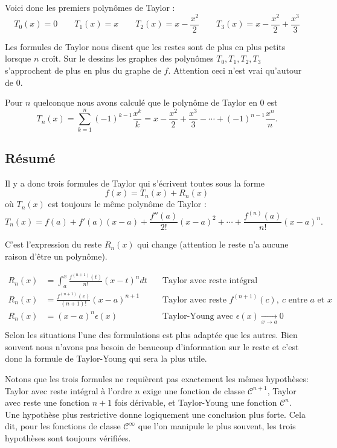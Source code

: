 \documentclass[class=report,crop=false]{standalone}
\begin{document}
Voici donc les premiers polynômes de Taylor :
$$T_0(x)=0 \qquad T_1(x) = x \qquad T_2(x) = x -\frac{x^2}{2}
\qquad T_3(x) = x -\frac{x^2}{2} + \frac{x^3}{3}$$

Les formules de Taylor nous disent que les restes sont de plus en plus petits lorsque $n$ croît.
Sur le dessins les graphes des polynômes $T_0, T_1, T_2, T_3$ s'approchent de plus en plus du graphe de $f$.
Attention ceci n'est vrai qu'autour de $0$.


Pour $n$ quelconque nous avons calculé que le polynôme de Taylor en $0$ est
$$T_n(x)=\sum_{k=1}^n (-1)^{k-1}\frac{x^k}{k} = x-\frac{x^2}{2} + \frac{x^3}{3}-\cdots + (-1)^{n-1}\frac{x^n}{n}.$$


\subsection{Résumé}


Il y a donc trois formules de Taylor qui s'écrivent toutes sous la forme
$$f(x) = T_n(x) + R_n(x)$$
où $T_n(x)$ est toujours le même polynôme de Taylor :
$$T_n(x) =f(a)+f'(a)(x-a)+\frac{f''(a)}{2!}(x-a)^2+\cdots
+\frac{f^{(n)}(a)}{n!}(x-a)^n.$$

C'est l'expression du reste $R_n(x)$ qui change (attention le reste n'a aucune raison d'être un polynôme).

\begin{align*}
R_n(x) & = \int_a^x \frac{f^{(n+1)}(t)}{n!}(x-t)^ndt
 & \quad   \text{Taylor avec reste intégral} \\
R_n(x) & =\frac{f^{(n+1)}(c)}{(n+1)!}(x-a)^{n+1}
 & \quad   \text{Taylor avec reste } f^{(n+1)}(c),\   c \text{ entre } a \text{ et } x \\
R_n(x) & = (x-a)^n\epsilon(x)
 & \quad \text{Taylor-Young avec } \epsilon(x) \xrightarrow[x\to a]{} 0 \\
\end{align*}
Selon les situations l'une des formulations est plus adaptée que les autres.
Bien souvent nous n'avons pas besoin de beaucoup d'information sur le reste et
c'est donc la formule de Taylor-Young qui sera la plus utile.

Notons que les trois formules ne requièrent pas exactement les mêmes hypothèses:
Taylor avec reste intégral à l'ordre $n$ exige une fonction de classe $\mathcal{C}^{n+1}$,
Taylor avec reste une fonction $n+1$ fois dérivable, et Taylor-Young une fonction $\mathcal{C}^n$.
Une hypothèse plus restrictive donne logiquement une conclusion plus forte.
Cela dit, pour les fonctions de classe $\mathcal{C}^\infty$ que l'on manipule le plus souvent,
les trois hypothèses sont toujours vérifiées.
\end{document}

